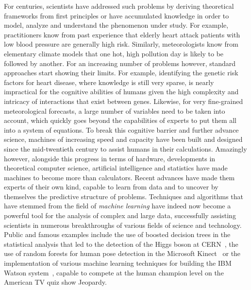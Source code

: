 For centuries, scientists have addressed such problems by deriving theoretical
frameworks from first principles or have accumulated knowledge in order to
model, analyze and understand the pheno\-menon under study. For example,
practitioners know from past experience that elderly heart attack patients with
low blood pressure are generally high risk. Similarly, meteorologists know from
elementary climate models that one hot, high pollution day is likely to be
followed by another. For an increasing number of problems however, standard
approaches start showing their limits. For example, identifying the genetic
risk factors for heart disease, where knowledge is still very sparse, is nearly
impractical for the cognitive abilities of humans given the high complexity and
intricacy of interactions that exist between genes. Likewise, for very
fine-grained meteorological forecasts, a large number of variables need to be taken
into account, which quickly goes beyond the capabilities of experts to put them
all into a system of equations. To break this cognitive barrier and further
advance science, machines of increasing speed and capacity have been built and
designed since the mid-twentieth century to assist humans in their
calculations. Amazingly however, alongside this progress in terms of hardware,
developments in theoretical computer science, artificial intelligence and
statistics have made machines to become more than calculators. Recent advances
have made them experts of their own kind, capable to learn from data and to
uncover by themselves the predictive structure of problems. Techniques and
algorithms that have stemmed from the field of {\it machine learning} have
indeed now become a powerful tool for the analysis of complex and large data,
successfully assisting scientists in numerous breakthroughs of various fields
of science and technology. Public and famous examples include the use of
boosted decision trees in the statistical analysis that led to the detection of
the Higgs boson at CERN~\citep{chatrchyan:2012}, the use of random forests for
human pose detection in the Microsoft Kinect~\citep{criminisi:2013} or the
implementation of various machine learning techniques for building the IBM
Watson system~\citep{ferrucci:2010}, capable to compete at the human champion
level on the American TV quiz show Jeopardy.

